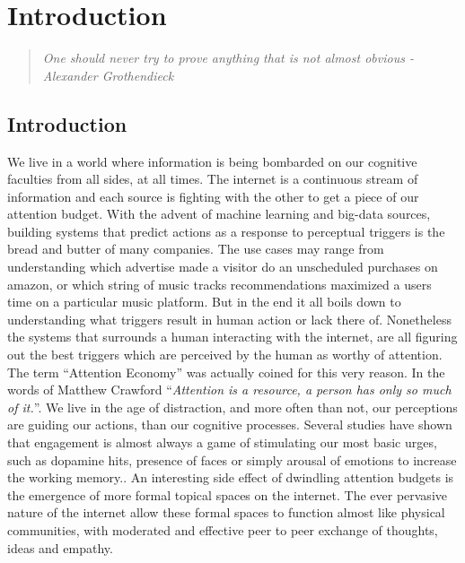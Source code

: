 
\chapter{Introduction}  %

\graphicspath{{Chapter1/Figures/} {Chapter1/Figures}}
\begin{quote}
\textsl{One should never try to prove anything that is not almost obvious - Alexander Grothendieck}
\end{quote}


\section{Introduction}

We live in a world where information is being bombarded on our cognitive faculties from all sides, at all times. The internet is a continuous stream of information and each source is fighting with the other to get a piece of our attention budget. 
With the advent of machine learning and big-data sources, building systems that predict actions as a response to perceptual triggers is the bread and butter of many companies. The use cases may range from understanding which advertise made a visitor do an unscheduled purchases on amazon, or which string of music tracks recommendations maximized a users time on a particular music platform. But in the end it all boils down to understanding what triggers result in human action or lack there of\cite{song2012survey}. Nonetheless the systems that surrounds a human interacting with the internet, are all figuring out the best triggers which are perceived by the human as worthy of attention. 
The term ``Attention Economy''\cite{davenport2001attention} was actually coined for this very reason. In the words of Matthew Crawford ``\textit{Attention is a resource, a person has only so much of it.}''\cite{MatthewCrawford}. We live in the age of distraction, and more often than not, our perceptions are guiding our actions, than our cognitive processes. Several studies have shown that engagement is almost always a game of stimulating our most basic urges, such as dopamine hits, presence of faces or simply arousal of emotions to increase the working memory.\cite{bakhshi2014faces,joglekar2017like}\cite{schupp2006emotion}\cite{soat2015social}. 
An interesting side effect of dwindling attention budgets is the emergence of more formal topical spaces on the internet. The ever pervasive nature of the internet allow these formal spaces to function almost like physical communities, with moderated and effective peer to peer exchange of thoughts, ideas and empathy\cite{kummervold2002social,squire2015should,hwang2010social}.

